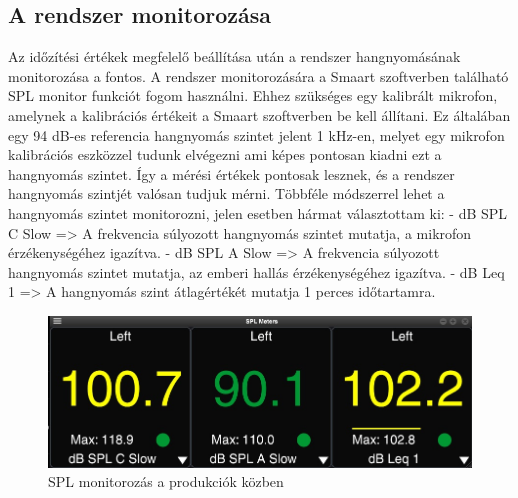 \subsection{A rendszer monitorozása}
Az időzítési értékek megfelelő beállítása után a rendszer hangnyomásának monitorozása a fontos.
A rendszer monitorozására a Smaart szoftverben található SPL monitor funkciót fogom használni.
Ehhez szükséges egy kalibrált mikrofon, amelynek a kalibrációs értékeit a Smaart szoftverben be kell állítani. 
Ez általában egy 94 dB-es referencia hangnyomás szintet jelent 1 kHz-en, melyet egy mikrofon kalibrációs eszközzel tudunk elvégezni ami képes pontosan kiadni ezt a hangnyomás szintet.
Így a mérési értékek pontosak lesznek, és a rendszer hangnyomás szintjét valósan tudjuk mérni.
Többféle módszerrel lehet a hangnyomás szintet monitorozni, jelen esetben hármat választottam ki:
- dB SPL C Slow => A frekvencia súlyozott hangnyomás szintet mutatja, a mikrofon érzékenységéhez igazítva.
- dB SPL A Slow => A frekvencia súlyozott hangnyomás szintet mutatja, az emberi hallás érzékenységéhez igazítva.
- dB Leq 1 => A hangnyomás szint átlagértékét mutatja 1 perces időtartamra.

\begin{figure}[H]
	\centering
	\includegraphics[width=\textwidth, keepaspectratio]{figures/smaart_spl_meter.jpg}
	\caption{SPL monitorozás a produkciók közben}\label{fig:smaart_spl_meter}
\end{figure}
